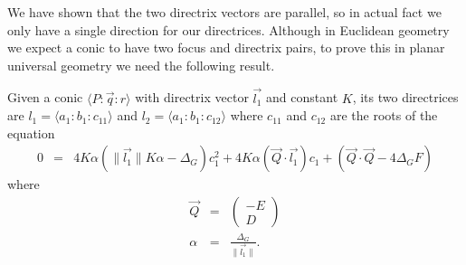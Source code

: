 We have shown that the two directrix vectors are parallel, so in actual fact we only have a single direction for our directrices.
Although in Euclidean geometry we expect a conic to have two focus and directrix pairs, to prove this in planar universal geometry we need the following result.
\begin{theorem}
Given a conic $\langle P\!:\!\vec{q}\!:\!r \rangle$ with directrix vector $\vec{l_1}$ and constant $K$, its two directrices are $l_1 = \langle a_1\!:\!b_1\!:\!c_{11} \rangle$ and $l_2 = \langle a_1\!:\!b_1\!:\!c_{12} \rangle$ where $c_{11}$ and $c_{12}$ are the roots of the equation
\begin{eqnarray}
0 & = & 4K\alpha(\|\vec{l_1}\|K\alpha - \Delta_G )c_1^2 + 4K\alpha(\vec{Q}\cdot\vec{l_1})c_1 + (\vec{Q}\cdot\vec{Q} - 4\Delta_GF)\label{eq:direc_c}
\end{eqnarray}
where
\begin{eqnarray}
\vec{Q} & = & \begin{pmatrix} -E \\ D \end{pmatrix}\\
\alpha & = & \frac{\Delta_G}{\|\vec{l_1}\|}.
\end{eqnarray}
\end{theorem}
